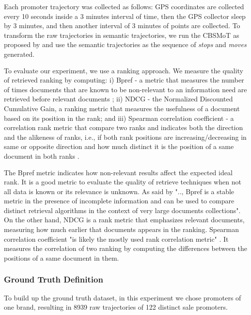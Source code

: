 \documentclass[12pt]{article}
\begin{document}
Each promoter trajectory was collected as follows: GPS coordinates are collected  every 10 seconds inside a 3 minutes interval of time, then the GPS collector sleep by 3 minutes, and then another interval of 3 minutes of points are collected.
To transform the raw trajectories in semantic trajectories, we run the CBSMoT as proposed by \cite{furtado:2017:cbsmot-like} and use the semantic trajectories as the sequence of \emph{stops} and \emph{moves} generated.

To evaluate our experiment, we use a ranking approach. We measure the quality of retrieved ranking by computing: i) Bpref - a metric that measures the number of times documents that are known to be non-relevant to an information need are retrieved before relevant documents \cite{BaezaYatesRibeiroNeto2011}; ii) NDCG - the Normalized Discounted Cumulative Gain, a ranking metric that measures the usefulness of a document based on its position in the rank\cite{BaezaYatesRibeiroNeto2011}; and iii) Spearman correlation coefficient - a correlation rank metric that compare two ranks and indicates both the direction and the alikeness of ranks, i.e., if both rank positions are increasing/decreasing in same or opposite direction and how much distinct it is the position of a same document in both ranks \cite{BaezaYatesRibeiroNeto2011}.

The Bpref metric indicates how non-relevant results affect the expected ideal rank. It is a good metric to evaluate the quality of retrieve techniques when not all data is known or its relevance is unknown. As said by \cite{BaezaYatesRibeiroNeto2011} ".., Bpref is a stable metric in the presence of incomplete information and can be used to compare distinct retrieval algorithms in the context of very large documents collections". On the other hand, NDCG is a rank metric that emphasizes relevant documents, measuring how much earlier that documents appears in the ranking. Spearman correlation coefficient "is likely the mostly used rank correlation metric" \cite{BaezaYatesRibeiroNeto2011}. It measures the correlation of two ranking by computing the differences between the positions of a same document in them.

\subsubsection{Ground Truth Definition}
To build up the ground truth dataset, in this experiment we chose promoters of one brand, resulting in 8939 raw trajectories of 122 distinct sale promoters.
\end{document}
